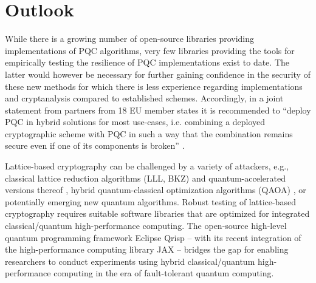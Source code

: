 \section{Outlook}

While there is a growing number of open-source libraries providing implementations of PQC algorithms, very few libraries providing the tools for empirically testing the resilience of PQC implementations exist to date. The latter would however be necessary for further gaining confidence in the security of these new methods for which there is less experience regarding implementations and cryptanalysis compared to established schemes. Accordingly, in a joint statement from partners from 18 EU member states it is recommended to ``deploy PQC in hybrid
solutions for most use-cases, i.e. combining a deployed cryptographic scheme with PQC in such a
way that the combination remains secure even if one of its components is broken'' \cite{BSI}.

Lattice-based cryptography can be challenged by a variety of attackers, e.g., classical lattice reduction algorithms (LLL, BKZ) and quantum-accelerated versions thereof \cite{prokop2024grover}, hybrid quantum-classical optimization algorithms (QAOA) \cite{koppl2024resilience}, or potentially emerging new quantum algorithms. Robust testing of lattice-based cryptography requires suitable software libraries that are optimized for integrated classical/quantum high-performance computing. 
The open-source high-level quantum programming framework Eclipse Qrisp \cite{Qrisp} -- with its recent integration of the high-performance computing library JAX -- bridges the gap for enabling researchers to conduct experiments using hybrid classical/quantum high-performance computing in the era of fault-tolerant quantum computing. 



